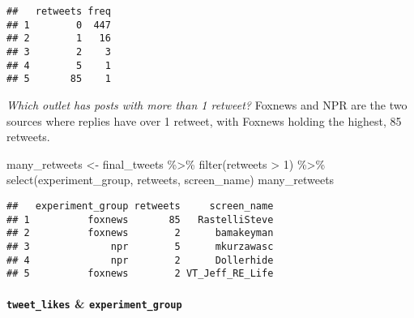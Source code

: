 \documentclass[
]{article}
\newenvironment{Shaded}{\begin{snugshade}}{\end{snugshade}}
\newcommand{\DecValTok}[1]{\textcolor[rgb]{0.00,0.00,0.81}{#1}}
\newcommand{\FunctionTok}[1]{\textcolor[rgb]{0.00,0.00,0.00}{#1}}
\newcommand{\NormalTok}[1]{#1}
\newcommand{\OtherTok}[1]{\textcolor[rgb]{0.56,0.35,0.01}{#1}}
\newcommand{\SpecialCharTok}[1]{\textcolor[rgb]{0.00,0.00,0.00}{#1}}
\newcommand{\StringTok}[1]{\textcolor[rgb]{0.31,0.60,0.02}{#1}}
\begin{document}
\begin{Shaded}
\end{Shaded}

\begin{verbatim}
##   retweets freq
## 1        0  447
## 2        1   16
## 3        2    3
## 4        5    1
## 5       85    1
\end{verbatim}

\emph{Which outlet has posts with more than 1 retweet? } Foxnews and NPR
are the two sources where replies have over 1 retweet, with Foxnews
holding the highest, 85 retweets.

\begin{Shaded}
\begin{Highlighting}[]
\NormalTok{many\_retweets }\OtherTok{\textless{}{-}}\NormalTok{ final\_tweets }\SpecialCharTok{\%\textgreater{}\%} \FunctionTok{filter}\NormalTok{(retweets }\SpecialCharTok{\textgreater{}} \DecValTok{1}\NormalTok{) }\SpecialCharTok{\%\textgreater{}\%} \FunctionTok{select}\NormalTok{(experiment\_group, retweets, screen\_name)}
\NormalTok{many\_retweets}
\end{Highlighting}
\end{Shaded}

\begin{verbatim}
##   experiment_group retweets     screen_name
## 1          foxnews       85   RastelliSteve
## 2          foxnews        2      bamakeyman
## 3              npr        5      mkurzawasc
## 4              npr        2      Dollerhide
## 5          foxnews        2 VT_Jeff_RE_Life
\end{verbatim}

\hypertarget{tweet_likes-experiment_group}{%
\paragraph{\texorpdfstring{\texttt{tweet\_likes} \&
\texttt{experiment\_group}}{tweet\_likes \& experiment\_group}}\label{tweet_likes-experiment_group}}
\end{document}
